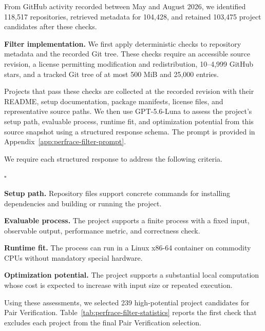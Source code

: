 From GitHub activity recorded between May and August 2026, we identified 118,517 repositories, retrieved metadata for 104,428, and retained 103,475 project candidates after these checks.



\textbf{Filter implementation.}
We first apply deterministic checks to repository metadata and the recorded Git tree.
These checks require an accessible source revision, a license permitting modification and redistribution, 10--4,999 GitHub stars, and a tracked Git tree of at most 500 MiB and 25,000 entries.

Projects that pass these checks are collected at the recorded revision with their README, setup documentation, package manifests, license files, and representative source paths.
We then use GPT-5.6-Luna to assess the project's setup path, evaluable process, runtime fit, and optimization potential from this source snapshot using a structured response schema.
The prompt is provided in Appendix~\ref{app:perfrace-filter-prompt}.

We require each structured response to address the following criteria.
\begin{list}{$\square$}{
  \setlength{\leftmargin}{1.6em}
  \setlength{\labelwidth}{1em}
  \setlength{\labelsep}{0.4em}
  \setlength{\topsep}{2pt}
  \setlength{\itemsep}{1pt}
  \setlength{\parsep}{0pt}
  \setlength{\partopsep}{0pt}
}
  \item \textbf{Setup path.} Repository files support concrete commands for installing dependencies and building or running the project.
  \item \textbf{Evaluable process.} The project supports a finite process with a fixed input, observable output, performance metric, and correctness check.
  \item \textbf{Runtime fit.} The process can run in a Linux x86-64 container on commodity CPUs without mandatory special hardware.
  \item \textbf{Optimization potential.} The project supports a substantial local computation whose cost is expected to increase with input size or repeated execution.
\end{list}

Using these assessments, we selected 239 high-potential project candidates for Pair Verification.
Table~\ref{tab:perfrace-filter-statistics} reports the first check that excludes each project from the final Pair Verification selection.

